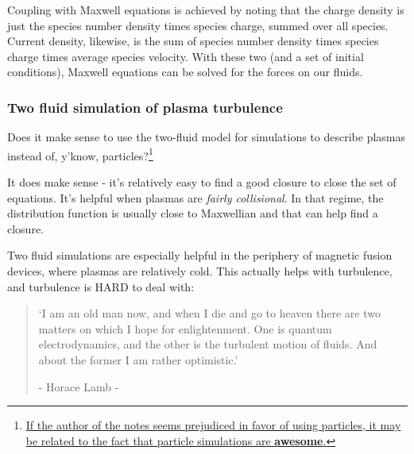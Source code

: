 \documentclass[PlasmaNotes.tex]{subfiles}
\begin{document}
Coupling with Maxwell equations is achieved by noting that the charge density is just the species number density times species charge, summed over all species. Current density, likewise, is the sum of species number density times species charge times average species velocity. With these two (and a set of initial conditions), Maxwell equations can be solved for the forces on our fluids.

\subsubsection{Two fluid simulation of plasma turbulence}

Does it make sense to use the two-fluid model for simulations to describe plasmas instead of, y'know, particles?\footnote{\href{https://www.youtube.com/watch?v=5sGKuoBnTn0&feature=youtu.be}{If the author of the notes seems prejudiced in favor of using particles, it may be related to the fact that particle simulations are \textbf{awesome}.}}

It does make sense - it's relatively easy to find a good closure to close the set of equations. It's helpful when plasmas are \emph{fairly collisional}. In that regime, the distribution function is usually close to Maxwellian and that can help find a closure.

Two fluid simulations are especially helpful in the periphery of magnetic fusion devices, where plasmas are relatively cold. This actually helps with turbulence, and turbulence is HARD to deal with:

\begin{quotation}
	`I am an old man now, and when I die and go to heaven there are two matters on which I hope for enlightenment. One is quantum electrodynamics, and the other is the turbulent motion of fluids. And about the former I am rather optimistic.'
	
- Horace Lamb -
\end{quotation}
\end{document}
